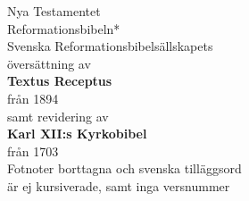 \begin{center}
    {\fontsize{42}{50}\selectfont Nya Testamentet}\\[1em]

    {\fontsize{20}{24}\selectfont  Reformationsbibeln*}\\[1em]

    {\fontsize{12}{15}\selectfont Svenska Reformationsbibelsällskapets\\[0.5em]
    översättning av}\\[1.2em]

    {\fontsize{20}{24}\selectfont \textbf{Textus Receptus}}\\[0.5em]
    {\fontsize{12}{15}\selectfont från 1894}\\[0.5em]

    {\fontsize{12}{15}\selectfont samt revidering av}\\[1em]

    {\fontsize{20}{24}\selectfont \textbf{Karl XII:s Kyrkobibel}}\\[0.5em]
    {\fontsize{12}{15}\selectfont från 1703}\\[4em]

    {\fontsize{11}{13} \selectfont *Fotnoter borttagna och svenska tilläggsord\\ är ej kursiverade, samt inga versnummer}

\end{center}